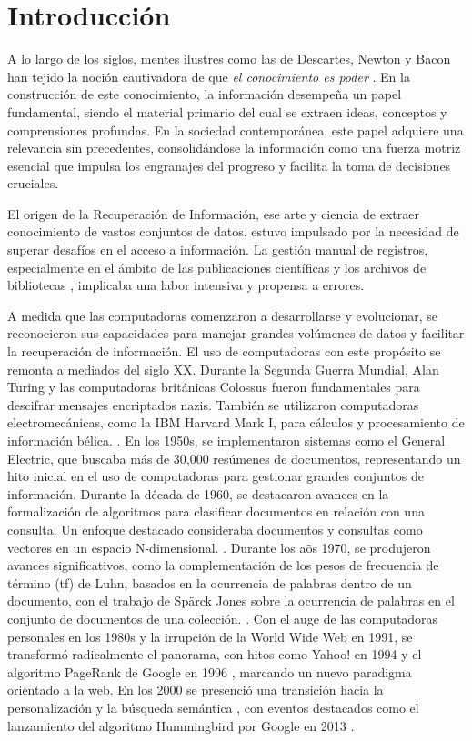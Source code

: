 \chapter*{Introducción}\label{chapter:introduction}

A lo largo de los siglos, mentes ilustres como las de Descartes, Newton y Bacon han tejido la noción cautivadora de que \textit{el conocimiento es poder} . En la construcci\'on de este conocimiento, la información desempeña un papel fundamental, siendo el material primario del cual se extraen ideas, conceptos y comprensiones profundas. En la sociedad contemporánea, este papel adquiere una relevancia sin precedentes, consolidándose la información como una fuerza motriz esencial que impulsa los engranajes del progreso y facilita la toma de decisiones cruciales.

El origen de la Recuperación de Información, ese arte y ciencia de extraer conocimiento de vastos conjuntos de datos, estuvo impulsado por la necesidad de superar desafíos en el acceso a información. La gestión manual de registros, especialmente en el ámbito de las publicaciones científicas y los archivos de bibliotecas , implicaba una labor intensiva y propensa a errores.

A medida que las computadoras comenzaron a desarrollarse y evolucionar, se reconocieron sus capacidades para manejar grandes vol\'umenes de datos y facilitar la recuperación de información. El uso de computadoras con este prop\'osito se remonta a mediados del siglo XX. Durante la Segunda Guerra Mundial, Alan Turing y las computadoras británicas Colossus fueron fundamentales para descifrar mensajes encriptados nazis. También se utilizaron computadoras electromecánicas, como la IBM Harvard Mark I, para cálculos y procesamiento de información bélica. . En los 1950s, se implementaron sistemas como el General Electric, que buscaba más de 30,000 resúmenes de documentos, representando un hito inicial en el uso de computadoras para gestionar grandes conjuntos de información.  Durante la década de 1960, se destacaron avances en la formalización de algoritmos para clasificar documentos en relación con una consulta. Un enfoque destacado consideraba documentos y consultas como vectores en un espacio N-dimensional. . Durante los a\~os 1970, se produjeron avances significativos, como la complementación de los pesos de frecuencia de término (tf) de Luhn, basados en la ocurrencia de palabras dentro de un documento, con el trabajo de Spärck Jones sobre la ocurrencia de palabras en el conjunto de documentos de una colección. . Con el auge de las computadoras personales en los 1980s  y la irrupción de la World Wide Web en 1991,  se transformó radicalmente el panorama, con hitos como Yahoo! en 1994  y el algoritmo PageRank de Google en 1996 , marcando un nuevo paradigma orientado a la web. En los 2000 se presenció una transición hacia la personalización y la búsqueda semántica , con eventos destacados como el lanzamiento del algoritmo Hummingbird por Google en 2013 . 


